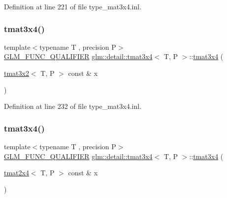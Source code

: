Definition at line 221 of file type\+\_\+mat3x4.\+inl.

\mbox{\label{structglm_1_1detail_1_1tmat3x4_ab32c639d1270be7cd3b0d6560d6180f2}} 
\subsubsection{\texorpdfstring{tmat3x4()}{tmat3x4()}\hspace{0.1cm}{\footnotesize\ttfamily [15/22]}}
{\footnotesize\ttfamily template$<$typename T , precision P$>$ \\
\hyperlink{setup_8hpp_a33fdea6f91c5f834105f7415e2a64407}{G\+L\+M\+\_\+\+F\+U\+N\+C\+\_\+\+Q\+U\+A\+L\+I\+F\+I\+ER} \hyperlink{structglm_1_1detail_1_1tmat3x4}{glm\+::detail\+::tmat3x4}$<$ T, P $>$\+::\hyperlink{structglm_1_1detail_1_1tmat3x4}{tmat3x4} (\begin{DoxyParamCaption}\item[{\hyperlink{structglm_1_1detail_1_1tmat3x2}{tmat3x2}$<$ T, P $>$ const \&}]{x }\end{DoxyParamCaption})\hspace{0.3cm}{\ttfamily [explicit]}}



Definition at line 232 of file type\+\_\+mat3x4.\+inl.

\mbox{\label{structglm_1_1detail_1_1tmat3x4_a80b305218294c0d85db5a2fe73712a66}} 
\subsubsection{\texorpdfstring{tmat3x4()}{tmat3x4()}\hspace{0.1cm}{\footnotesize\ttfamily [16/22]}}
{\footnotesize\ttfamily template$<$typename T , precision P$>$ \\
\hyperlink{setup_8hpp_a33fdea6f91c5f834105f7415e2a64407}{G\+L\+M\+\_\+\+F\+U\+N\+C\+\_\+\+Q\+U\+A\+L\+I\+F\+I\+ER} \hyperlink{structglm_1_1detail_1_1tmat3x4}{glm\+::detail\+::tmat3x4}$<$ T, P $>$\+::\hyperlink{structglm_1_1detail_1_1tmat3x4}{tmat3x4} (\begin{DoxyParamCaption}\item[{\hyperlink{structglm_1_1detail_1_1tmat2x4}{tmat2x4}$<$ T, P $>$ const \&}]{x }\end{DoxyParamCaption})\hspace{0.3cm}{\ttfamily [explicit]}}



